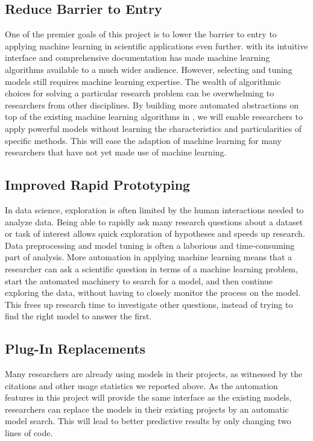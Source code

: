 \subsection{Reduce Barrier to Entry}
One of the premier goals of this project is to lower the barrier to entry
to applying machine learning in scientific applications even further.
\sklearn{} with its intuitive interface and comprehensive documentation
has made machine learning algorithms available to a much wider audience.
However, selecting and tuning models still requires machine learning expertise.
The wealth of algorithmic choices for solving a particular research problem can be
overwhelming to researchers from other disciplines. By building more automated
abstractions on top of the existing machine learning algorithms in \sklearn{},
we will enable researchers to apply powerful models without learning
the characteristics and particularities of specific methods.
This will ease the adaption of machine learning for many researchers
that have not yet made use of machine learning.

\subsection{Improved Rapid Prototyping}
In data science, exploration is often limited by the human interactions needed to analyze data.
Being able to rapidly ask many research questions about a dataset or task of interest allows
quick exploration of hypotheses and speeds up research.
Data preprocessing and model tuning is often a laborious and time-consuming part of analysis.
More automation in applying machine learning means that a researcher can ask a scientific
question in terms of a machine learning problem, start the automated machinery to
search for a model, and then continue exploring the data, without having to closely monitor
the process on the model. 
This frees up research time to investigate other questions, instead of trying to
find the right model to answer the first.

\subsection{Plug-In Replacements}
Many researchers are already using \sklearn{} models in their projects, as witnessed
by the citations and other usage statistics we reported above. As the automation features
in this project will provide the same interface as the existing models, researchers
can replace the models in their existing projects by an automatic model search.
This will lead to better predictive results by only changing two lines of code.

